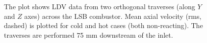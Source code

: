 \begin{figure}[h]

\centering



\caption[Effect of preheat temperature on the LSB flow field - IV]{The plot shows LDV data from two orthogonal traverses (along \(Y\) and \(Z\) axes) across the LSB combustor. Mean axial velocity (rms, dashed) is plotted for cold and hot cases (both non-reacting). The traverses are performed 75 mm downstream of the inlet.}

\label{fig:temperatureLDVTransverse3}

\end{figure}

